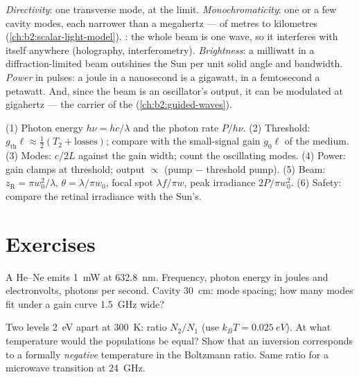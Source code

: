 \begin{remark}\label{rem:b2:laser:special}
\emph{Directivity}: one transverse mode,  at the 
limit. \emph{Monochromaticity}: one or a few cavity modes, each
narrower than a megahertz ---  of metres to kilometres
(\cref{ch:b2:scalar-light-model}). \emph{}: the whole
beam is one wave, so it interferes with itself anywhere (holography,
interferometry). \emph{Brightness}: a milliwatt in a diffraction-limited
beam outshines the Sun per unit solid angle and bandwidth. \emph{Power}
in pulses: a joule in a nanosecond is a gigawatt, in a femtosecond a
petawatt. And, since the beam is an oscillator's output, it can be
modulated at gigahertz --- the carrier of the 
(\cref{ch:b2:guided-waves}).
\end{remark}

\begin{method}\label{meth:b2:laser:method}
(1) Photon energy $h\nu = hc/\lambda$ and the photon rate $P/h\nu$.
(2) Threshold: $g_{\text{th}}\ell \approx \tfrac12(T_2 + \text{losses})$;
compare with the small-signal gain $g_0\ell$ of the medium.
(3) Modes: $c/2L$ against the gain width; count the oscillating modes.
(4) Power: gain clamps at threshold; output $\propto$ (pump $-$
threshold pump). (5) Beam: $z_{\text{R}} = \pi w_0^2/\lambda$, $\theta =
\lambda/\pi w_0$, focal spot $\lambda f/\pi w$, peak irradiance
$2P/\pi w_0^2$. (6) Safety: compare the retinal irradiance with the
Sun's.
\end{method}

\section{Exercises}

\begin{exercise}[$\star$]\label{exo:b2:laser:1}
A He--Ne  emits \qty{1}{mW} at \qty{632.8}{nm}. Frequency, photon
energy in joules and electronvolts, photons per second. Cavity
\qty{30}{cm}: mode spacing; how many modes fit under a gain curve
\qty{1.5}{GHz} wide?
\end{exercise}

\begin{exercise}[$\star$]\label{exo:b2:laser:2}
Two levels \qty{2}{eV} apart at \qty{300}{K}: ratio $N_2/N_1$ (use
$k_BT = \qty{0.025}{eV}$). At what temperature would the populations be
equal? Show that an inversion corresponds to a formally \emph{negative}
temperature in the Boltzmann ratio. Same ratio for a microwave
transition at \qty{24}{GHz}.
\end{exercise}

